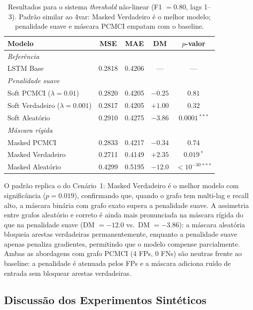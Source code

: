 \documentclass[12pt, a4paper]{article}
\begin{document}
\begin{table}[H]
\centering
\caption{Resultados para o sistema \emph{threshold} não-linear (F1 $= 0.80$, lags 1--3). Padrão similar ao 4var: Masked Verdadeiro é o melhor modelo; penalidade suave e máscara PCMCI empatam com o baseline.}
\label{tab:results_threshold}
\begin{tabular}{lcccc}
\toprule
Modelo & MSE & MAE & DM & $p$-valor \\
\midrule
\multicolumn{5}{l}{\textit{Referência}} \\
LSTM Base                                    & 0.2818 & 0.4206 & — & — \\
\midrule
\multicolumn{5}{l}{\textit{Penalidade suave}} \\
Soft PCMCI ($\lambda=0.01$)                  & 0.2820 & 0.4205 & $-0.25$ & $0.81$ \\
Soft Verdadeiro ($\lambda=0.001$)            & 0.2817 & 0.4205 & $+1.00$ & $0.32$ \\
Soft Aleatório                               & 0.2910 & 0.4275 & $-3.86$ & $0.0001$\,$^{***}$ \\
\midrule
\multicolumn{5}{l}{\textit{Máscara rígida}} \\
Masked PCMCI                                 & 0.2833 & 0.4217 & $-0.34$ & $0.74$ \\
Masked Verdadeiro                   & 0.2711 & 0.4149 & $+2.35$ & $0.019$\,$^{*}$ \\
Masked Aleatório                             & 0.4299 & 0.5195 & $-12.0$ & $<\!10^{-30}$\,$^{***}$ \\
\bottomrule
\end{tabular}
\end{table}

O padrão replica o do Cenário~1: Masked Verdadeiro é o melhor modelo com significância ($p = 0.019$), confirmando que, quando o grafo tem multi-lag e recall alto, a máscara binária com grafo exato supera a penalidade suave. A assimetria entre grafos aleatório e correto é ainda mais pronunciada na máscara rígida do que na penalidade suave (DM $= -12.0$ vs.\ DM $= -3.86$): a máscara aleatória bloqueia arestas verdadeiras permanentemente, enquanto a penalidade suave apenas penaliza gradientes, permitindo que o modelo compense parcialmente.
Ambas as abordagens com grafo PCMCI (4 FPs, 0 FNs) são neutras frente ao baseline: a penalidade é atenuada pelos FPs e a máscara adiciona ruído de entrada sem bloquear arestas verdadeiras.

\subsection{Discussão dos Experimentos Sintéticos}
\end{document}
